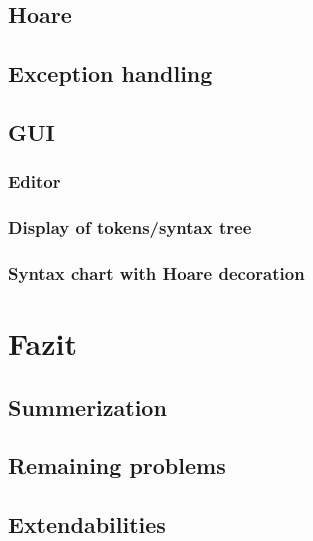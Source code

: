 







\section{Hoare}

\section{Exception handling}

\section{GUI}

\subsection{Editor}
\subsection{Display of tokens/syntax tree}
\subsection{Syntax chart with Hoare decoration}

\chapter{Fazit}\label{ch:fazit}
\section{Summerization}
\section{Remaining problems}
\section{Extendabilities}


